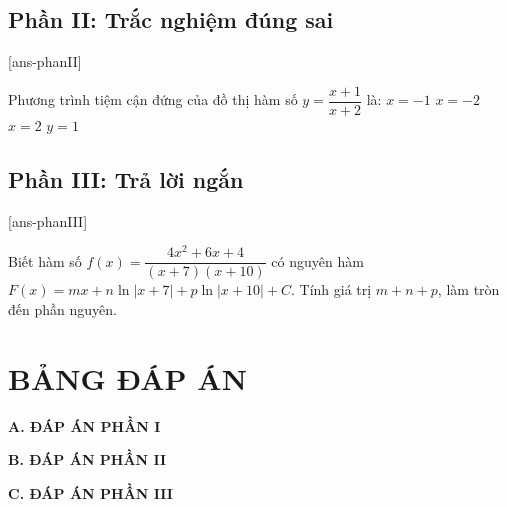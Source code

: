 \documentclass{article}
\providecommand{\choiceTFt}{\choiceTF}
\begin{document}
\subsection{Phần II: Trắc nghiệm đúng sai}
\cauds
{}[ans-phanII]

\begin{ex}
Phương trình tiệm cận đứng của đồ thị hàm số $y=\dfrac{x+1}{x+2}$ là:
\choiceTFt
    {$x=-1$}
    {\True $x=-2$}
    {$x=2$}
    {$y=1$}
\end{ex}

\subsection{Phần III: Trả lời ngắn}
\caukq
{}[ans-phanIII]

\begin{ex}
Biết hàm số $f(x)=\dfrac{4x^2 + 6x + 4}{(x + 7)(x + 10)}$ có nguyên hàm $F(x)=mx + n\ln|x + 7| + p\ln|x + 10| + C$. Tính giá trị $m + n + p$, làm tròn đến phần nguyên.
\end{ex}

\section*{BẢNG ĐÁP ÁN}
\noindent\textbf{A. ĐÁP ÁN PHẦN I}

\noindent\textbf{B. ĐÁP ÁN PHẦN II}

\noindent\textbf{C. ĐÁP ÁN PHẦN III}
\end{document}
